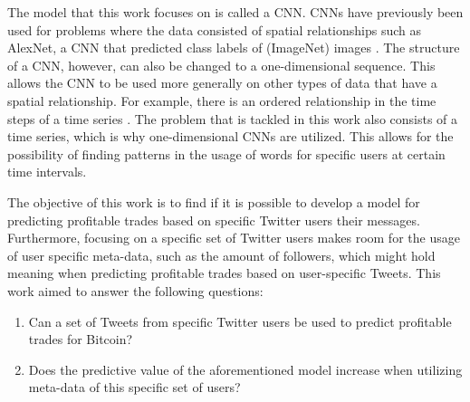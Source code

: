 \documentclass[sigconf]{acmart-txmm}
\begin{document}
The model that this work focuses on is called a CNN. CNNs have previously been used for problems where the data consisted of spatial relationships such as AlexNet, a CNN that predicted class labels of (ImageNet) images \cite{NIPS2012_4824}. The structure of a CNN, however, can also be changed to a one-dimensional sequence. This allows the CNN to be used more generally on other types of data that have a spatial relationship. For example, there is an ordered relationship in the time steps of a time series \cite{machine_learning_mastery_2018}. The problem that is tackled in this work also consists of a time series, which is why one-dimensional CNNs are utilized. This allows for the possibility of finding patterns in the usage of words for specific users at certain time intervals.

The objective of this work is to find if it is possible to develop a model for predicting profitable trades based on specific Twitter users their messages. Furthermore, focusing on a specific set of Twitter users makes room for the usage of user specific meta-data, such as the amount of followers, which might hold meaning when predicting profitable trades based on user-specific Tweets. This work aimed to answer the following questions:
\begin{enumerate}
    \item Can a set of Tweets from specific Twitter users be used to predict profitable trades for Bitcoin?
    \item Does the predictive value of the aforementioned model increase when utilizing meta-data of this specific set of users?
\end{enumerate}
\end{document}

